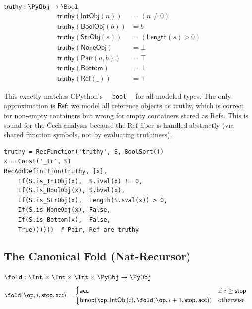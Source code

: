 \begin{definition}[Truthiness]
$\mathsf{truthy} : \PyObj \to \Bool$
\begin{align}
  \mathsf{truthy}(\mathsf{IntObj}(n)) &= (n \neq 0) \\
  \mathsf{truthy}(\mathsf{BoolObj}(b)) &= b \\
  \mathsf{truthy}(\mathsf{StrObj}(s)) &= (\mathsf{Length}(s) > 0) \\
  \mathsf{truthy}(\mathsf{NoneObj}) &= \bot \\
  \mathsf{truthy}(\mathsf{Pair}(a, b)) &= \top \\
  \mathsf{truthy}(\mathsf{Bottom}) &= \bot \\
  \mathsf{truthy}(\mathsf{Ref}(\_)) &= \top
\end{align}
\end{definition}

\begin{remark}
This exactly matches CPython's \texttt{\_\_bool\_\_} for all modeled
types.  The only approximation is $\mathsf{Ref}$: we model all
reference objects as truthy, which is correct for non-empty containers
but wrong for empty containers stored as Refs.  This is sound for
the \v{C}ech analysis because the Ref fiber is handled abstractly
(via shared function symbols, not by evaluating truthiness).
\end{remark}

\begin{lstlisting}[caption={truthy: complete Z3 implementation}]
truthy = RecFunction('truthy', S, BoolSort())
x = Const('_tr', S)
RecAddDefinition(truthy, [x],
    If(S.is_IntObj(x),  S.ival(x) != 0,
    If(S.is_BoolObj(x), S.bval(x),
    If(S.is_StrObj(x),  Length(S.sval(x)) > 0,
    If(S.is_NoneObj(x), False,
    If(S.is_Bottom(x),  False,
    True))))))  # Pair, Ref are truthy
\end{lstlisting}

\subsection{The Canonical Fold (Nat-Recursor)}

\begin{definition}
$\fold : \Int \times \Int \times \Int \times \PyObj \to \PyObj$
\begin{align}
  \fold(\op, i, \mathsf{stop}, \mathsf{acc}) &= \begin{cases}
    \mathsf{acc} & \text{if } i \geq \mathsf{stop} \\
    \mathsf{binop}(\op, \mathsf{IntObj}(i),
      \fold(\op, i+1, \mathsf{stop}, \mathsf{acc}))
      & \text{otherwise}
  \end{cases}
\end{align}
\end{definition}

